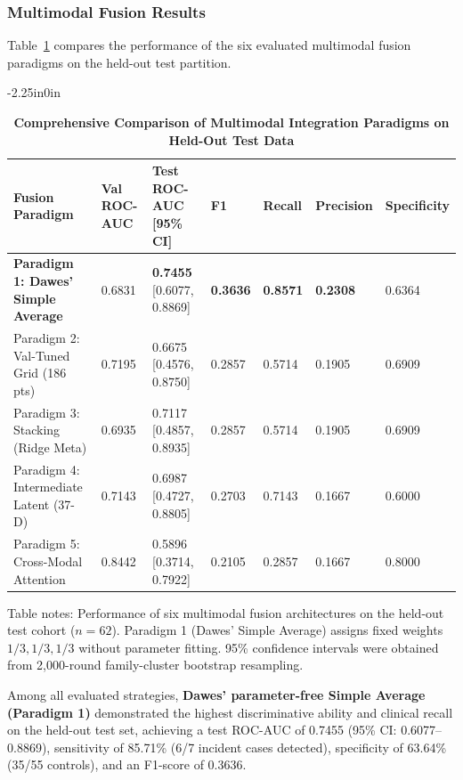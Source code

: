 \documentclass[10pt,letterpaper]{article}
\begin{document}
\subsubsection*{Multimodal Fusion Results}
Table~\ref{tab:fusion_results} compares the performance of the six evaluated multimodal fusion paradigms on the held-out test partition.

\begin{table}[!t]
\begin{adjustwidth}{-2.25in}{0in}
\centering
\caption{\textbf{Comprehensive Comparison of Multimodal Integration Paradigms on Held-Out Test Data}}
\label{tab:fusion_results}
\footnotesize
\renewcommand{\arraystretch}{1.15}
\begin{tabular}{|p{4.2cm}|p{2.6cm}|p{2.4cm}|p{1.4cm}|p{1.4cm}|p{1.4cm}|p{1.4cm}|}
\hline
\textbf{Fusion Paradigm} & \textbf{Val ROC-AUC} & \textbf{Test ROC-AUC [95\% CI]} & \textbf{F1} & \textbf{Recall} & \textbf{Precision} & \textbf{Specificity} \\
\hline
\textbf{Paradigm 1: Dawes' Simple Average} & 0.6831 & \textbf{0.7455} [0.6077, 0.8869] & \textbf{0.3636} & \textbf{0.8571} & \textbf{0.2308} & 0.6364 \\
\hline
Paradigm 2: Val-Tuned Grid (186 pts) & 0.7195 & 0.6675 [0.4576, 0.8750] & 0.2857 & 0.5714 & 0.1905 & 0.6909 \\
\hline
Paradigm 3: Stacking (Ridge Meta) & 0.6935 & 0.7117 [0.4857, 0.8935] & 0.2857 & 0.5714 & 0.1905 & 0.6909 \\
\hline
Paradigm 4: Intermediate Latent (37-D) & 0.7143 & 0.6987 [0.4727, 0.8805] & 0.2703 & 0.7143 & 0.1667 & 0.6000 \\
\hline
Paradigm 5: Cross-Modal Attention & 0.8442 & 0.5896 [0.3714, 0.7922] & 0.2105 & 0.2857 & 0.1667 & 0.8000 \\
\hline
\end{tabular}
\begin{flushleft}
Table notes: Performance of six multimodal fusion architectures on the held-out test cohort ($n=62$). Paradigm 1 (Dawes' Simple Average) assigns fixed weights $1/3, 1/3, 1/3$ without parameter fitting. 95\% confidence intervals were obtained from 2,000-round family-cluster bootstrap resampling.
\end{flushleft}
\end{adjustwidth}
\end{table}

Among all evaluated strategies, \textbf{Dawes' parameter-free Simple Average (Paradigm 1)} demonstrated the highest discriminative ability and clinical recall on the held-out test set, achieving a test ROC-AUC of 0.7455 (95\% CI: 0.6077--0.8869), sensitivity of 85.71\% (6/7 incident cases detected), specificity of 63.64\% (35/55 controls), and an F1-score of 0.3636. 
\end{document}
